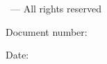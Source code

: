 
\thispagestyle{empty}
{\raisebox{.35ex}{\smaller\copyright}}\,\doccopyrightholder{} \doccopyrightyears{} --- All rights reserved
\vspace{2ex}

\begin{flushright}
Document number: \textbf{\LARGE\docno}

Date: \reldate
\end{flushright}

\vfill

\textbf{\LARGE \doctitle}

\vfill





\vfill
\noindent
\pagebreak

\thispagestyle{docpage}




